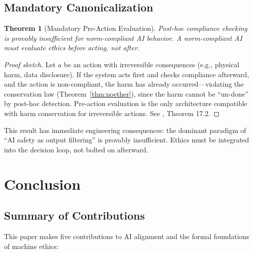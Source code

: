 \documentclass[12pt,letterpaper]{article}
\newtheorem{theorem}{Theorem}[section]
\theoremstyle{definition}
\theoremstyle{remark}
\begin{document}
\subsection{Mandatory Canonicalization}

\begin{theorem}[Mandatory Pre-Action Evaluation]
\label{thm:mandatory}
Post-hoc compliance checking is provably insufficient for norm-compliant AI behavior. A norm-compliant AI must evaluate ethics \emph{before} acting, not after.
\end{theorem}

\begin{proof}[Proof sketch]
Let $a$ be an action with irreversible consequences (e.g., physical harm, data disclosure). If the system acts first and checks compliance afterward, and the action is non-compliant, the harm has already occurred---violating the conservation law (Theorem~\ref{thm:noether}), since the harm cannot be ``un-done'' by post-hoc detection. Pre-action evaluation is the only architecture compatible with harm conservation for irreversible actions. See \cite{bond2026geometric}, Theorem 17.2.
\end{proof}

This result has immediate engineering consequences: the dominant paradigm of ``AI safety as output filtering'' is provably insufficient. Ethics must be integrated into the decision loop, not bolted on afterward.


\section{Conclusion}
\label{sec:conclusion}

\subsection{Summary of Contributions}

This paper makes five contributions to AI alignment and the formal foundations of machine ethics:
\end{document}
